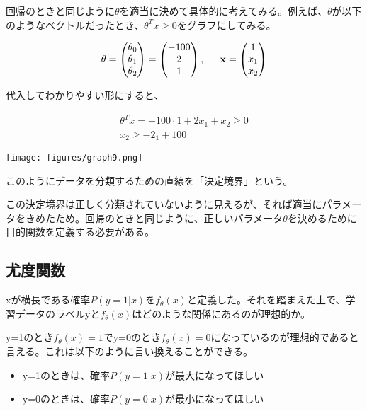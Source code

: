 \documentclass{jsarticle}
\begin{document}
回帰のときと同じように$\theta$を適当に決めて具体的に考えてみる。例えば、$\theta$が以下のようなベクトルだったとき、$\theta^{T}x \geq 0$をグラフにしてみる。

\begin{align}
  	\bf{\theta} = \begin{pmatrix} 
      \theta_0\\
      \theta_1\\
      \theta_2
	\end{pmatrix}
    = \begin{pmatrix} 
      -100\\
      2\\
      1
	\end{pmatrix}
    ,
    \hspace{15pt}
    x = \begin{pmatrix} 
      1\\
      x_1\\
      x_2
	\end{pmatrix}
\end{align}

代入してわかりやすい形にすると、

\begin{align}
	\theta^{T}x = -100 \cdot 1 + 2x_1 + x_2 \geq 0 \\
    x_2 \geq -2_1 + 100
\end{align}

\begin{center}
  \texttt{[image: figures/graph9.png]}
\end{center}

このようにデータを分類するための直線を「決定境界」という。

この決定境界は正しく分類されていないように見えるが、それば適当にパラメータをきめたため。回帰のときと同じように、正しいパラメータ$\theta$を決めるために目的関数を定義する必要がある。

\subsection{尤度関数}
xが横長である確率$P(y=1|x)をf_\theta(x)$と定義した。それを踏まえた上で、学習データのラベルyと$f_\theta(x)$はどのような関係にあるのが理想的か。

y=1のとき$f_\theta(x)=1$でy=0のとき$f_\theta(x)=0$になっているのが理想的であると言える。これは以下のように言い換えることができる。

\begin{itemize}
	\item{y=1のときは、確率$P(y=1|x)$が最大になってほしい}
    \item{y=0のときは、確率$P(y=0|x)$が最小になってほしい}
\end{itemize}
\end{document}
